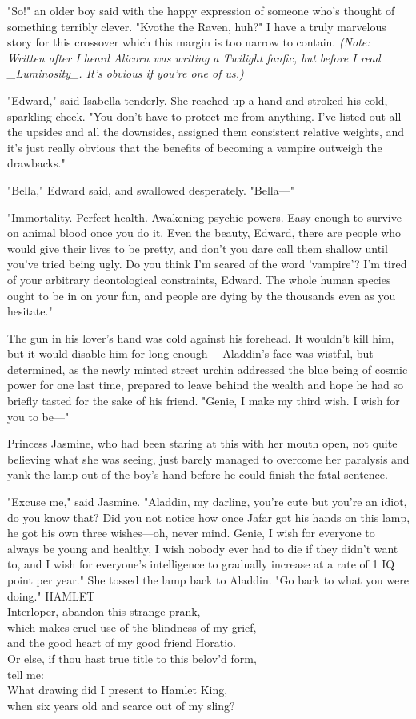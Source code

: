 "So!" an older boy said with the happy expression of someone who's thought of 
something terribly clever. "Kvothe the Raven, huh?"
\sbreak
I have a truly marvelous story for this crossover which this margin is too 
narrow to contain.
\sbreak
\emph{(Note: Written after I heard Alicorn was writing a Twilight fanfic, but 
before I read \_Luminosity\_. It's obvious if you're one of us.)}

"Edward," said Isabella tenderly. She reached up a hand and stroked his cold, 
sparkling cheek. "You don't have to protect me from anything. I've listed out 
all the upsides and all the downsides, assigned them consistent relative 
weights, and it's just really obvious that the benefits of becoming a vampire 
outweigh the drawbacks."

"Bella," Edward said, and swallowed desperately. "Bella---"

"Immortality. Perfect health. Awakening psychic powers. Easy enough to survive 
on animal blood once you do it. Even the beauty, Edward, there are people who 
would give their lives to be pretty, and don't you dare call them shallow until 
you've tried being ugly. Do you think I'm scared of the word 'vampire'? I'm 
tired of your arbitrary deontological constraints, Edward. The whole human 
species ought to be in on your fun, and people are dying by the thousands even 
as you hesitate."

The gun in his lover's hand was cold against his forehead. It wouldn't kill 
him, but it would disable him for long enough---
\sbreak
Aladdin's face was wistful, but determined, as the newly minted street urchin 
addressed the blue being of cosmic power for one last time, prepared to leave 
behind the wealth and hope he had so briefly tasted for the sake of his friend. 
"Genie, I make my third wish. I wish for you to be---"

Princess Jasmine, who had been staring at this with her mouth open, not quite 
believing what she was seeing, just barely managed to overcome her paralysis 
and yank the lamp out of the boy's hand before he could finish the fatal 
sentence.

"Excuse me," said Jasmine. "Aladdin, my darling, you're cute but you're an 
idiot, do you know that? Did you not notice how once Jafar got his hands on 
this lamp, he got his own three wishes---oh, never mind. Genie, I wish for 
everyone to always be young and healthy, I wish nobody ever had to die if they 
didn't want to, and I wish for everyone's intelligence to gradually increase at 
a rate of 1 IQ point per year." She tossed the lamp back to Aladdin. "Go back 
to what you were doing."
\sbreak
HAMLET\\
Interloper, abandon this strange prank,\\
which makes cruel use of the blindness of my grief,\\
and the good heart of my good friend Horatio.\\
Or else, if thou hast true title to this belov'd form,\\
tell me:\\
What drawing did I present to Hamlet King,\\
when six years old and scarce out of my sling?

